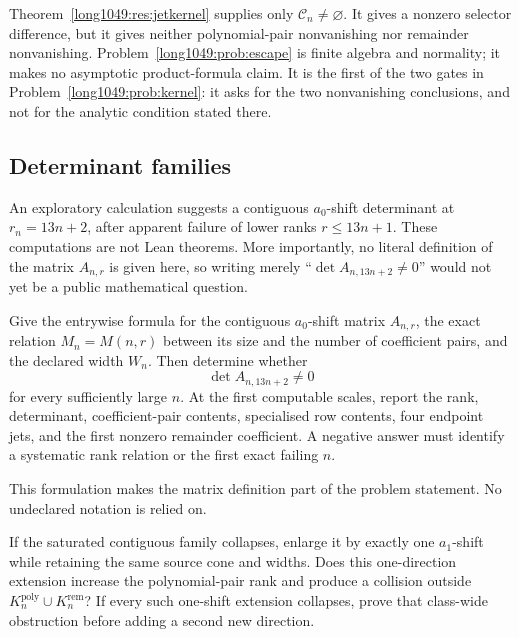 Theorem~\ref{long1049:res:jetkernel} supplies only $\mathcal C_n\ne\varnothing$.
It gives a nonzero selector difference, but it gives neither polynomial-pair
nonvanishing nor remainder nonvanishing.  Problem~\ref{long1049:prob:escape} is finite
algebra and normality; it makes no asymptotic product-formula claim.  It is the
first of the two gates in Problem~\ref{long1049:prob:kernel}: it asks for the two
nonvanishing conclusions, and not for the analytic condition stated there.

\subsection{Determinant families}

An exploratory calculation suggests a contiguous $a_0$-shift determinant at
$r_n=13n+2$, after apparent failure of lower ranks $r\le13n+1$.  These
computations are not Lean theorems.  More importantly, no literal definition
of the matrix $A_{n,r}$ is given here, so writing merely
“$\det A_{n,13n+2}\ne0$” would not yet be a public mathematical question.

\begin{problem}
Give the entrywise formula for the contiguous $a_0$-shift matrix $A_{n,r}$,
the exact relation $M_n=M(n,r)$ between its size and the number of coefficient
pairs, and the declared width $W_n$.  Then determine whether
\[
 \det A_{n,13n+2}\ne0
\]
for every sufficiently large $n$.  At the first computable scales, report the
rank, determinant, coefficient-pair contents, specialised row contents, four
endpoint jets, and the first nonzero remainder coefficient.  A negative answer
must identify a systematic rank relation or the first exact failing $n$.
\end{problem}

This formulation makes the matrix definition part of the problem statement.  No
undeclared notation is relied on.

\begin{problem}
If the saturated contiguous family collapses, enlarge it by exactly one
$a_1$-shift while retaining the same source cone and widths.  Does this
one-direction extension increase the polynomial-pair rank and produce a
collision outside
$K_n^{\mathrm{poly}}\cup K_n^{\mathrm{rem}}$?  If every such one-shift
extension collapses, prove that class-wide obstruction before adding a second
new direction.
\end{problem}

